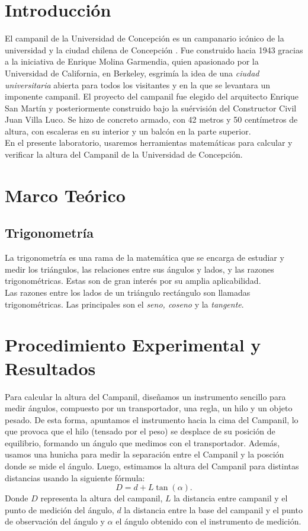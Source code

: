 \documentclass[10pt,a4paper]{article}
\begin{document}
	\begin{multicols}{2}
		\section*{Introducción} \label{Intro}
			El campanil de la Universidad de Concepción es un campanario icónico de la universidad y la ciudad chilena de Concepción \cite{wikicamp}. Fue construido hacia 1943 gracias a la iniciativa de Enrique Molina Garmendia, quien apasionado por la Universidad de California, en Berkeley, esgrimía la idea de una \emph{ciudad universitaria} abierta para todos los visitantes y en la que se levantara un imponente campanil. El proyecto del campanil fue elegido del arquitecto Enrique San Martín y posteriormente construido bajo la suérvisión del Constructor Civil Juan Villa Luco. Se hizo de concreto armado, con 42 metros y 50 centímetros de altura, con escaleras en su interior y un balcón en la parte superior.\\
			En el presente laboratorio, usaremos herramientas matemáticas para calcular y verificar la altura del Campanil de la Universidad de Concepción.
		\section*{Marco Teórico} \label{marco}
		\subsection*{Trigonometría}
		La trigonometría es una rama de la matemática que se encarga de estudiar y medir los triángulos, las relaciones entre sus ángulos y lados, y las razones trigonométricas. Estas son de gran interés por su amplia aplicabilidad.\\
		Las razones entre los lados de un triángulo rectángulo son llamadas trigonométricas. Las principales son el \emph{seno, coseno} y la \emph{tangente}.\\
		\section*{Procedimiento Experimental y Resultados}
		Para calcular la altura del Campanil, diseñamos un instrumento sencillo para medir ángulos, compuesto por un transportador, una regla, un hilo y un objeto pesado. De esta forma, apuntamos el instrumento hacia la cima del Campanil, lo que provoca que el hilo (tensado por el peso) se desplace de su posición de equilibrio, formando un ángulo que medimos con el transportador. Además, usamos una hunicha para medir la separación entre el Campanil y la posción donde se mide el ángulo. Luego, estimamos la altura del Campanil para distintas distancias usando la siguiente fórmula:
		\begin{equation}
		D = d + L \tan(\alpha).
		\end{equation}
		Donde $D$ representa la altura del campanil, $L$ la distancia entre campanil y el punto de medición del ángulo, $d$ la distancia entre la base del campanil y el punto de observación del ángulo y $\alpha$ el ángulo obtenido con el instrumento de medición.
		

\end{multicols}
\end{document}
